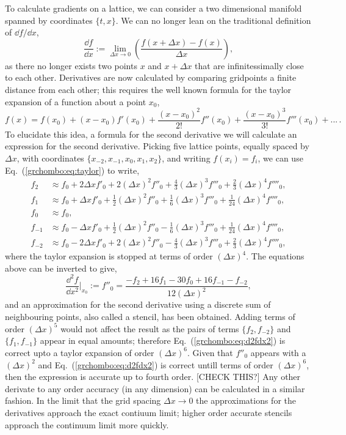 To calculate gradients on a lattice, we can consider a two dimensional manifold spanned by coordinates $\{t,x\}$. We can no longer lean on the traditional definition of $\dd f / \dd x$,
\begin{equation}
\frac{\dd f}{\dd x} := \lim_{\Delta x \rightarrow 0} \left( \frac{f(x+\Delta x)-f(x)}{\Delta x} \right),
\end{equation}
as there no longer exists two points $x$ and $x+\Delta x$ that are infinitessimally close to each other. Derivatives are now calculated by comparing gridpoints a finite distance from each other; this requires the well known formula for the taylor expansion of a function about a point $x_0$,
\begin{equation}
f(x) = f(x_0) + (x-x_0) f'(x_0) + \frac{(x-x_0)^2}{2!}f''(x_0) + \frac{(x-x_0)^3}{3!}f'''(x_0) + ... \,. \label{grchombo:eq:taylor}
\end{equation}
To elucidate this idea, a formula for the second derivative we will calculate an expression for the second derivative. Picking five lattice points, equally spaced by $\Delta x$, with coordinates $\{x_{-2},x_{-1},x_{0},x_{1},x_{2}\}$, and writing $f(x_i) = f_i$, we can use Eq.~(\ref{grchombo:eq:taylor}) to write,
\begin{align}
f_{2} &\approx f_0 + 2\Delta x f'_0 + 2 (\Delta x)^2 f''_0 + \frac{4}{3}(\Delta x)^3 f'''_0+ \frac{2}{3} (\Delta x)^4 f''''_0, \\
f_{1} &\approx f_0 + \Delta x f'_0 + \frac{1}{2}(\Delta x)^2f''_0 + \frac{1}{6}(\Delta x)^3f'''_0 + \frac{1}{24}(\Delta x)^4f''''_0,\\
f_0 &\approx f_0 , \\
f_{-1} &\approx f_0 - \Delta x f'_0 + \frac{1}{2}(\Delta x)^2f''_0 - \frac{1}{6}(\Delta x)^3f'''_0 + \frac{1}{24}(\Delta x)^4f''''_0,\\
f_{-2} &\approx f_0 - 2\Delta x f'_0 + 2 (\Delta x)^2 f''_0 - \frac{4}{3}(\Delta x)^3 f'''_0+ \frac{2}{3} (\Delta x)^4 f''''_0,
\end{align}
where the taylor expansion is stopped at terms of order $(\Delta x)^4$. The equations above can be inverted to give,
\begin{equation}
\frac{\dd^2 f}{\dd x^2}\Bigg|_{x_0}:=f''_0 = \frac{-f_2 + 16 f_1 - 30 f_0 + 16 f_{-1} - f_{-2} }{12 (\Delta x)^2}, \label{grchombo:eq:d2fdx2}
\end{equation}
and an approximation for the second derivative using a discrete sum of neighbouring points, also called a stencil, has been obtained. Adding terms of order $(\Delta x)^5$ would not affect the result as the pairs of terms $\{f_2,f_{-2}\}$ and $\{f_1,f_{-1}\}$ appear in equal amounts; therefore Eq.~(\ref{grchombo:eq:d2fdx2}) is correct upto a taylor expansion of order $(\Delta x)^6$. Given that $f''_0$ appears with a $(\Delta x)^2$ and Eq.~(\ref{grchombo:eq:d2fdx2}) is correct untill terms of order $(\Delta x)^6$, then the expression is accurate up to fourth order. [CHECK THIS?] Any other derivate to any order accuracy (in any dimension) can be calculated in a similar fashion. In the limit that the grid spacing $\Delta x \rightarrow 0$ the approximations for the derivatives approach the exact contiuum limit; higher order accurate stencils approach the continuum limit more quickly.



